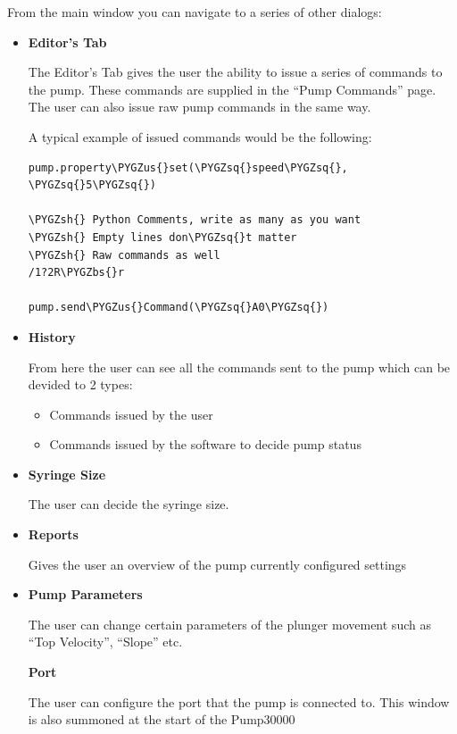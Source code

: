 \documentclass[letterpaper,10pt,english]{sphinxmanual}
\def\PYGZbs{\char`\\}
\def\PYGZus{\char`\_}
\def\PYGZsh{\char`\#}
\def\PYGZsq{\char`\'}
\begin{document}
From the main window you can navigate to a series of other dialogs:
\begin{itemize}
\item {} 
\textbf{Editor's Tab}

The Editor's Tab gives the user the ability to issue a series of commands to the pump.
These commands are supplied in the ``Pump Commands'' page. The user can also issue raw
pump commands in the same way.

A typical example of issued commands would be the following:

\begin{Verbatim}[commandchars=\\\{\}]
pump.property\PYGZus{}set(\PYGZsq{}speed\PYGZsq{}, \PYGZsq{}5\PYGZsq{})

\PYGZsh{} Python Comments, write as many as you want
\PYGZsh{} Empty lines don\PYGZsq{}t matter
\PYGZsh{} Raw commands as well
/1?2R\PYGZbs{}r

pump.send\PYGZus{}Command(\PYGZsq{}A0\PYGZsq{})
\end{Verbatim}

\item {} 
\textbf{History}

From here the user can see all the commands sent to the pump which can be devided to 2 types:
\begin{itemize}
\item {} 
Commands issued by the user

\item {} 
Commands issued by the software to decide pump status

\end{itemize}

\item {} 
\textbf{Syringe Size}

The user can decide the syringe size.

\item {} 
\textbf{Reports}

Gives the user an overview of the pump currently configured settings

\item {} 
\textbf{Pump Parameters}

The user can change certain parameters of the plunger movement such as ``Top Velocity'', ``Slope'' etc.

\textbf{Port}

The user can configure the port that the pump is connected to. This window is
also summoned at the start of the Pump30000

\end{itemize}
\end{document}
